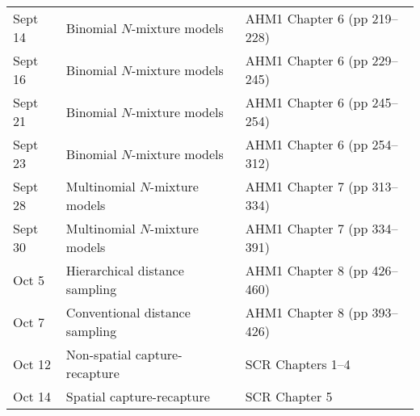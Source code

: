\documentclass[12pt]{article}
\begin{document}
\begin{center}
\begin{tabular}[c]{lll}
\hline
Sept 14    & Binomial $N$-mixture models                  & AHM1 Chapter 6 (pp 219--228)                         \\
Sept 16    & Binomial $N$-mixture models                  & AHM1 Chapter 6 (pp 229--245)                         \\
\hline
Sept 21    & Binomial $N$-mixture models                  & AHM1 Chapter 6 (pp 245--254)                         \\
Sept 23    & Binomial $N$-mixture models                  & AHM1 Chapter 6 (pp 254--312)                         \\
\hline
Sept 28    & Multinomial $N$-mixture models               & AHM1 Chapter 7 (pp 313--334)                         \\
Sept 30    & Multinomial $N$-mixture models               & AHM1 Chapter 7 (pp 334--391)                         \\
\hline
Oct 5     & Hierarchical distance sampling               & AHM1 Chapter 8 (pp 426--460)                          \\
Oct 7     & Conventional distance sampling               & AHM1 Chapter 8 (pp 393--426)                         \\
\hline
Oct 12     & Non-spatial capture-recapture                & SCR Chapters 1--4                         \\
Oct 14     & Spatial capture-recapture                    & SCR Chapter 5                                \\

\end{tabular}
\end{center}
\end{document}
